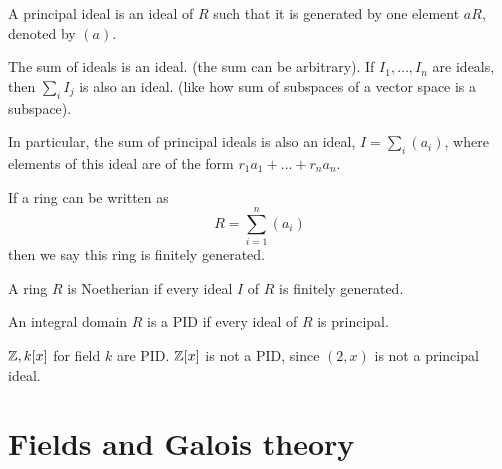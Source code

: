 \begin{defn}
    A principal ideal is an ideal of $R$ such that it is generated by one element $aR$, denoted by $(a)$.
\end{defn}
\begin{prop}
    The sum of ideals is an ideal. (the sum can be arbitrary). If $I_1, \dots, I_n$ are ideals, then $\sum_{i}I_j$ is also an ideal. (like how sum of subspaces of a vector space is a subspace).

    In particular, the sum of principal ideals is also an ideal, $I=\sum_i(a_i)$, where elements of this ideal are of the form $r_1a_1+\dots+r_na_n$. 
\end{prop}
\begin{defn}
    If a ring can be written as 
    \begin{equation*}
        R=\sum_{i=1}^n(a_i)
    \end{equation*}
    then we say this ring is finitely generated.
\end{defn}
\begin{defn}[Noetherian]
    A ring $R$ is Noetherian if every ideal $I$ of $R$ is finitely generated.
\end{defn}
\begin{defn}[PID]
    An integral domain $R$ is a PID if every ideal of $R$ is principal.
\end{defn}
\begin{example}
    $\mathbb{Z}, k[x]$ for field $k$ are PID. $\mathbb{Z}[x]$ is not a PID, since $(2,x)$ is not a principal ideal.
\end{example}




\chapter{Fields and Galois theory}
\begin{defn}
    
\end{defn}